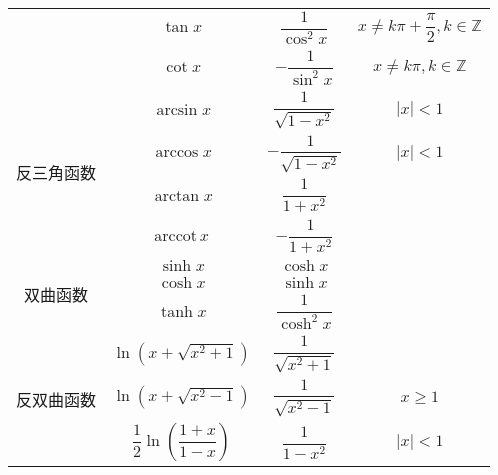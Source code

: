 \begin{table}
\begin{tabular}{|c|c|c|c|}
                                    & $\tan x$                                            & $\dfrac{1}{\cos^{2}x}$       & $x \ne k\pi + \dfrac{\pi}{2}, k\in \mathbb{Z}$ \\
                                    & $\cot x$                                            & $-\dfrac{1}{\sin^{2}x}$      & $x \ne k\pi, k\in \mathbb{Z}$                  \\[8pt]
        \hline
        \multirow{4}{*}{反三角函数} & $\arcsin x$                                         & $\dfrac{1}{\sqrt{1 - x^2}}$  & $|x| < 1$                                      \\
                                    & $\arccos x$                                         & $-\dfrac{1}{\sqrt{1 - x^2}}$ & $|x| < 1$                                      \\
                                    & $\arctan x$                                         & $\dfrac{1}{1 + x^2}$         &                                                \\
                                    & $\mathrm{arccot}\, x$                               & $-\dfrac{1}{1 + x^2}$        &                                                \\[8pt]
        \hline
        \multirow{3}{*}{双曲函数}   & $\sinh x$                                           & $\cosh x$                    &                                                \\
                                    & $\cosh x$                                           & $\sinh x$                    &                                                \\
                                    & $\tanh x$                                           & $\dfrac{1}{\cosh^{2}x}$      &                                                \\[8pt]
        \hline
        \multirow{3}{*}{反双曲函数} & $\ln (x + \sqrt{x^2 + 1})$                          & $\dfrac{1}{\sqrt{x^2 + 1}}$  &                                                \\
                                    & $\ln (x + \sqrt{x^2 - 1})$                          & $\dfrac{1}{\sqrt{x^2 - 1}}$  & $x \geqslant 1$                                \\
                                    & $\dfrac{1}{2}\ln \left(\dfrac{1 + x}{1 - x}\right)$ & $\dfrac{1}{1 - x^2}$         & $|x| < 1$                                      \\[10pt]
        \hline
    \end{tabular}
\end{table}


